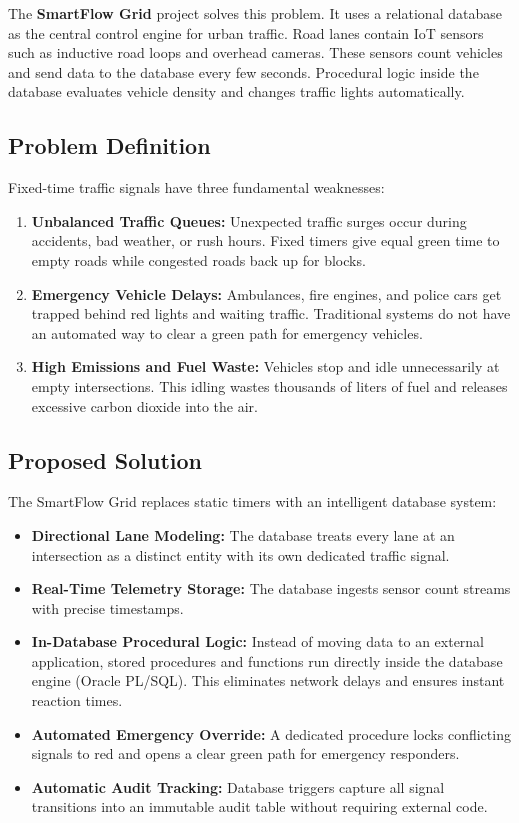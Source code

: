 \documentclass[11pt,a4paper]{article}
\begin{document}
The \textbf{SmartFlow Grid} project solves this problem. It uses a relational database as the central control engine for urban traffic. Road lanes contain IoT sensors such as inductive road loops and overhead cameras. These sensors count vehicles and send data to the database every few seconds. Procedural logic inside the database evaluates vehicle density and changes traffic lights automatically.

\subsection{Problem Definition}
Fixed-time traffic signals have three fundamental weaknesses:
\begin{enumerate}
    \item \textbf{Unbalanced Traffic Queues:} Unexpected traffic surges occur during accidents, bad weather, or rush hours. Fixed timers give equal green time to empty roads while congested roads back up for blocks.
    \item \textbf{Emergency Vehicle Delays:} Ambulances, fire engines, and police cars get trapped behind red lights and waiting traffic. Traditional systems do not have an automated way to clear a green path for emergency vehicles.
    \item \textbf{High Emissions and Fuel Waste:} Vehicles stop and idle unnecessarily at empty intersections. This idling wastes thousands of liters of fuel and releases excessive carbon dioxide into the air.
\end{enumerate}

\subsection{Proposed Solution}
The SmartFlow Grid replaces static timers with an intelligent database system:
\begin{itemize}
    \item \textbf{Directional Lane Modeling:} The database treats every lane at an intersection as a distinct entity with its own dedicated traffic signal.
    \item \textbf{Real-Time Telemetry Storage:} The database ingests sensor count streams with precise timestamps.
    \item \textbf{In-Database Procedural Logic:} Instead of moving data to an external application, stored procedures and functions run directly inside the database engine (Oracle PL/SQL). This eliminates network delays and ensures instant reaction times.
    \item \textbf{Automated Emergency Override:} A dedicated procedure locks conflicting signals to red and opens a clear green path for emergency responders.
    \item \textbf{Automatic Audit Tracking:} Database triggers capture all signal transitions into an immutable audit table without requiring external code.
\end{itemize}
\end{document}
